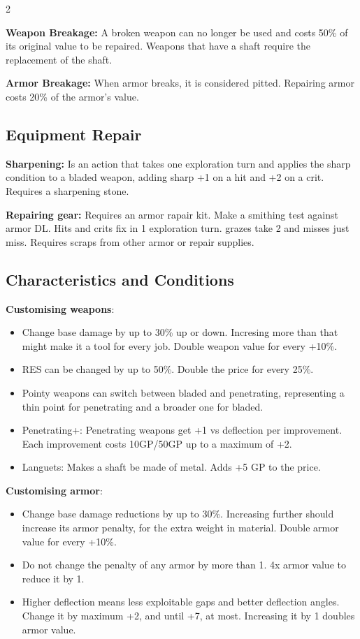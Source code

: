 \begin{multicols}{2}

\textbf{Weapon Breakage:} A broken weapon can no longer be used and costs 50\% of its original value to be repaired. Weapons that have a shaft require the replacement of the shaft.

\textbf{Armor Breakage:} When armor breaks, it is considered pitted. Repairing armor costs 20\% of the armor's value.

\subsection{Equipment Repair}

\textbf{Sharpening:} Is an action that takes one exploration turn and applies the sharp condition to a bladed weapon, adding sharp +1 on a hit and +2 on a crit. Requires a sharpening stone.

\textbf{Repairing gear:} Requires an armor rapair kit. Make a smithing test against armor DL. Hits and crits fix in 1 exploration turn. grazes take 2 and misses just miss. Requires scraps from other armor or repair supplies.


\subsection{Characteristics and Conditions}

\textbf{Customising weapons}:  
\begin{itemize}
    \item Change base damage by up to 30\% up or down. Incresing more than that might make it a tool for every job. Double weapon value for every +10\%. 
    \item RES can be changed by up to 50\%. Double the price for every 25\%.
    \item Pointy weapons can switch between bladed and penetrating, representing a thin point for penetrating and a broader one for bladed.
    \item Penetrating+: Penetrating weapons get +1 vs deflection per improvement. Each improvement costs 10GP/50GP up to a maximum of +2. 
    \item Languets: Makes a shaft be made of metal. Adds +5 GP to the price.
\end{itemize}

\textbf{Customising armor}:
\begin{itemize}
    \item Change base damage reductions by up to 30\%. Increasing further should increase its armor penalty, for the extra weight in material. Double armor value for every +10\%. 
    \item Do not change the penalty of any armor by more than 1. 4x armor value to reduce it by 1.
    \item Higher deflection means less exploitable gaps and better deflection angles. Change it by maximum +2, and until +7, at most. Increasing it by 1 doubles armor value.
\end{itemize}


\end{multicols}
